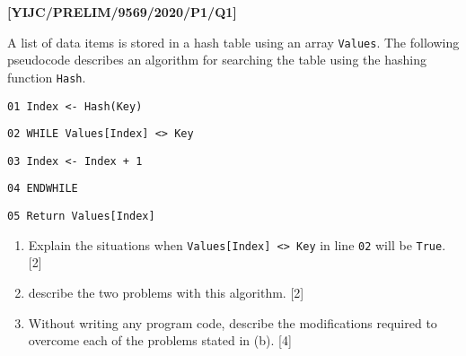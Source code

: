 \item \textbf{{[}YIJC/PRELIM/9569/2020/P1/Q1{]} }

A list of data items is stored in a hash table using an array \texttt{Values}.
The following pseudocode describes an algorithm for searching the
table using the hashing function \texttt{Hash}. 

\noindent\begin{minipage}[t]{1\columnwidth}%
\texttt{01 Index <- Hash(Key) }

\texttt{02 WHILE Values{[}Index{]} <> Key }

\texttt{03 \qquad{}Index <- Index + 1}

\texttt{04 ENDWHILE }

\texttt{05 Return Values{[}Index{]} }%
\end{minipage}
\begin{enumerate}
\item Explain the situations when \textquotedbl\texttt{Values{[}Index{]}
<> Key\textquotedbl} in line \texttt{02} will be \texttt{True}.
\hfill{}{[}2{]}
\item describe the two problems with this algorithm. \hfill{}{[}2{]}
\item Without writing any program code, describe the modifications required
to overcome each of the problems stated in (b). \hfill{}{[}4{]}
\end{enumerate}